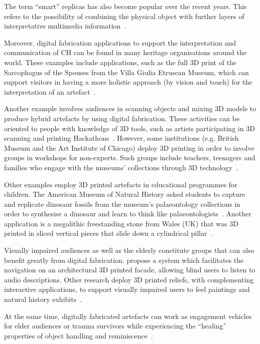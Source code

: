 \documentclass[acmlarge,screen,dvipsnames]{acmart}
\begin{document}
The term ``smart'' replicas has also become popular over the recent
years. This refers to the possibility of combining the physical object
with further layers of interpretative multimedia
information~\cite{Capurro2015,Marshall2016}.

Moreover, digital fabrication applications to support the
interpretation and communication of CH can be found in many heritage
organisations around the world. These examples include applications,
such as the full 3D print of the Sarcophagus of the Spouses from the
Villa Giulia Etruscan Museum, which can support visitors in having a
more holistic approach (by vision and touch) for the interpretation of
an artefact~\cite{Guidazzoli2014}.

Another example involves audiences in scanning objects and mixing 3D
models to produce hybrid artefacts by using digital fabrication. These
activities can be oriented to people with knowledge of 3D tools, such
as artists participating in 3D scanning and printing
Hackathons~\cite{Mullaney2012,Neely2013}. However, some institutions
(e.g. British Museum and the Art Institute of Chicago) deploy 3D
printing in order to involve groups in workshops for non-experts. Such
groups include teachers, teenagers and families who engage with the
museums' collections through 3D
technology~\cite{BritishMuseum2016,Neely2015,Miles2015}.

Other examples employ 3D printed artefacts in educational programmes
for children. The American Museum of Natural History asked students to
capture and replicate dinosaur fossils from the museum's palaeontology
collections in order to synthesise a dinosaur and learn to think like
palaeontologists~\cite{AMNH2013}. Another application is a megalithic
freestanding stone from Wales (UK) that was 3D printed in sliced
vertical pieces that slide down a cylindrical pillar~\cite{Miles2015}.

Visually impaired audiences as well as the elderly constitute groups
that can also benefit greatly from digital
fabrication. \cite{DAgnano2015} propose a system which facilitates
the navigation on an architectural 3D printed facade, allowing blind
users to listen to audio descriptions. Other research deploy 3D
printed reliefs, with complementing interactive applications, to
support visually impaired users to feel paintings and natural history
exhibits~\cite{Reichinger2016a,Samaroudi2017}.

At the same time, digitally fabricated artefacts can work as
engagement vehicles for elder audiences or trauma survivors while
experiencing the ``healing'' properties of object handling and
reminiscence~\cite{PleaseTouch2016}.
\end{document}
